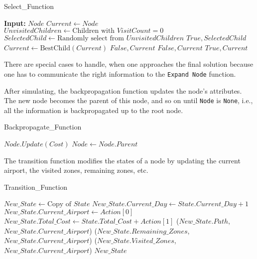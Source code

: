 \begin{algorithm}[H]
    \caption{Select\_Function}
    \label{alg:SelectFunction}
    \begin{algorithmic}[1]
        \STATE \textbf{Input:} $Node$
        \STATE $Current \leftarrow Node$
        \STATE $UnvisitedChildren \leftarrow \text{Children with } VisitCount = 0$
        \STATE $SelectedChild \leftarrow \text{Randomly select from } UnvisitedChildren$
        \RETURN $True, SelectedChild$
        \ENDIF
        \ELSE
        \STATE $Current \leftarrow \text{BestChild}(Current)$
        \ENDIF
        \ENDWHILE
        \RETURN $False, Current$
        \RETURN $False, Current$
        \RETURN $True, Current$
        \ENDIF
    \end{algorithmic}
\end{algorithm}

There are special cases to handle, when one approaches the final solution because one has to communicate the right information to the \texttt{Expand Node} function.

After simulating, the backpropagation function updates the node's attributes. The new node becomes the parent of this node, and so on until \texttt{Node} is \texttt{None}, i.e., all the information is backpropagated up to the root node.

\begin{algorithm}[H]
    \caption{Backpropagate\_Function}
    \label{alg:Backpropagate}
    \begin{algorithmic}[1]
        \STATE $Node.Update(Cost)$
        \STATE $Node \leftarrow Node.Parent$
        \ENDWHILE
    \end{algorithmic}
\end{algorithm}

The transition function modifies the states of a node by updating the current airport, the visited zones, remaining zones, etc.

\begin{algorithm}[H]
    \caption{Transition\_Function}
    \label{alg:TransitionFunction}
    \begin{algorithmic}[1]
        \STATE $New\_State \leftarrow \text{Copy of } State$
        \STATE $New\_State.Current\_Day \leftarrow State.Current\_Day + 1$
        \STATE $New\_State.Current\_Airport \leftarrow Action[0]$
        \STATE $New\_State.Total\_Cost \leftarrow State.Total\_Cost + Action[1]$
        \STATE {}($New\_State.Path$, $New\_State.Current\_Airport$)
        \STATE {}($New\_State.Remaining\_Zones$, $New\_State.Current\_Airport$)
        \STATE {}($New\_State.Visited\_Zones$, $New\_State.Current\_Airport$)
        \RETURN $New\_State$
    \end{algorithmic}
\end{algorithm}

